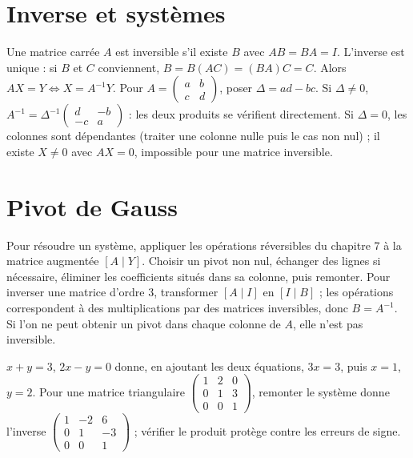 \documentclass[../cours_tle.tex]{subfiles}
\begin{document}
\section{Inverse et systèmes}
Une matrice carrée $A$ est inversible s'il existe $B$ avec $AB=BA=I$. L'inverse est unique : si $B$ et $C$ conviennent, $B=B(AC)=(BA)C=C$.
Alors $AX=Y\Leftrightarrow X=A^{-1}Y$.
Pour $A=\begin{pmatrix}a&b\\c&d\end{pmatrix}$, poser $\Delta=ad-bc$.
Si $\Delta\ne0$,
$A^{-1}=\Delta^{-1}\begin{pmatrix}d&-b\\-c&a\end{pmatrix}$ : les deux produits se vérifient directement.
Si $\Delta=0$, les colonnes sont dépendantes (traiter une colonne nulle puis le cas non nul) ; il existe $X\ne0$ avec $AX=0$, impossible pour une matrice inversible.
\section{Pivot de Gauss}
Pour résoudre un système, appliquer les opérations réversibles du chapitre 7 à la matrice augmentée $[A\mid Y]$. Choisir un pivot non nul, échanger des lignes si nécessaire, éliminer les coefficients situés dans sa colonne, puis remonter.
Pour inverser une matrice d'ordre $3$, transformer $[A\mid I]$ en $[I\mid B]$ ; les opérations correspondent à des multiplications par des matrices inversibles, donc $B=A^{-1}$. Si l'on ne peut obtenir un pivot dans chaque colonne de $A$, elle n'est pas inversible.
\begin{exemple}
$x+y=3$, $2x-y=0$ donne, en ajoutant les deux équations, $3x=3$, puis $x=1$, $y=2$.
Pour une matrice triangulaire $\begin{pmatrix}1&2&0\\0&1&3\\0&0&1\end{pmatrix}$, remonter le système donne l'inverse
$\begin{pmatrix}1&-2&6\\0&1&-3\\0&0&1\end{pmatrix}$ ; vérifier le produit protège contre les erreurs de signe.
\end{exemple}
\end{document}
